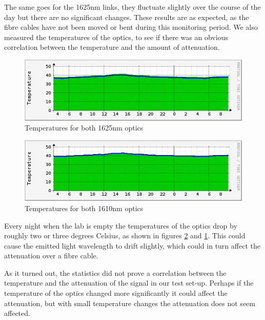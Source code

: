 \documentclass{article}
\begin{document}
The same goes for the 1625nm links, they fluctuate slightly over the course of the day but there are no significant changes.
These results are as expected, as the fibre cables have not been moved or bent during this monitoring period.
We also measured the temperatures of the optics, to see if there was an obvious correlation between the temperature and the amount of attenuation.
\begin{figure}[h!]
\centerline{\includegraphics[scale=0.7]{images/temp1625.png}}
\caption{Temperatures for both 1625nm optics}
\label{fig:temp1625}
\end{figure}
\begin{figure}[h!]
\centerline{\includegraphics[scale=0.7]{images/temp1610.png}}
\caption{Temperatures for both 1610nm optics}
\label{fig:temp1610}
\end{figure}
Every night when the lab is empty the temperatures of the optics drop by roughly two or three degrees Celsius, as shown in figures \ref{fig:temp1610} and \ref{fig:temp1625}.
This could cause the emitted light wavelength to drift slightly, which could in turn affect the attenuation over a fibre cable.

As it turned out, the statistics did not prove a correlation between the temperature and the attenuation of the signal in our test set-up.
Perhaps if the temperature of the optics changed more significantly it could affect the attenuation, but with small temperature changes the attenuation does not seem affected.

\newpage
\end{document}
